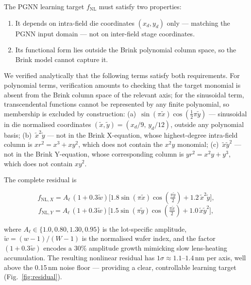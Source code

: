 \documentclass[10pt,conference]{IEEEtran}
\begin{document}
The PGNN learning target $f_{\mathrm{NL}}$ must satisfy two properties:
\begin{enumerate}
  \item It depends on intra-field die coordinates $(x_d, y_d)$ only —
        matching the PGNN input domain — not on inter-field stage coordinates.
  \item Its functional form lies outside the Brink polynomial column
        space, so the Brink model cannot capture it.
\end{enumerate}

We verified analytically that the following terms satisfy both requirements.
For polynomial terms, verification amounts to checking that the target
monomial is absent from the Brink column space of the relevant axis; for
the sinusoidal term, transcendental functions cannot be represented by any
finite polynomial, so membership is excluded by construction:
(a)~$\sin(\pi\tilde{x})\cos(\tfrac{1}{2}\pi\tilde{y})$ — sinusoidal in
die normalised coordinates $(\tilde{x},\tilde{y}) = (x_d/9,\, y_d/12)$,
outside any polynomial basis;
(b)~$\tilde{x}^2\tilde{y}$ — not in the Brink X-equation, whose
highest-degree intra-field column is $xr^2 = x^3+xy^2$, which does not
contain the $x^2y$ monomial;
(c)~$\tilde{x}\tilde{y}^2$ — not in the Brink Y-equation, whose
corresponding column is $yr^2 = x^2y+y^3$, which does not contain $xy^2$.

The complete residual is

\begin{equation}
  f_{\mathrm{NL},X}
  = A_\ell\,(1 + 0.3\tilde{w})\!
    \bigl[1.8\sin(\pi\tilde{x})\cos(\tfrac{\pi\tilde{y}}{2})
           + 1.2\,\tilde{x}^2\tilde{y}\bigr],
  \label{eq:nl_x}
\end{equation}
\begin{equation}
  f_{\mathrm{NL},Y}
  = A_\ell\,(1 + 0.3\tilde{w})\!
    \bigl[1.5\sin(\pi\tilde{y})\cos(\tfrac{\pi\tilde{x}}{2})
           + 1.0\,\tilde{x}\tilde{y}^2\bigr],
  \label{eq:nl_y}
\end{equation}

\noindent where $A_\ell \in \{1.0, 0.80, 1.30, 0.95\}$ is the lot-specific
amplitude, $\tilde{w}\!=\!(w-1)/(W-1)$ is the normalised wafer index, and
the factor $(1+0.3\tilde{w})$ encodes a 30\% amplitude growth mimicking
slow lens-heating accumulation.  The resulting nonlinear residual has
$1\sigma \approx 1.1$–$1.4$\,nm per axis, well above the 0.15\,nm noise
floor — providing a clear, controllable learning target
(Fig.~\ref{fig:residual}).
\end{document}
